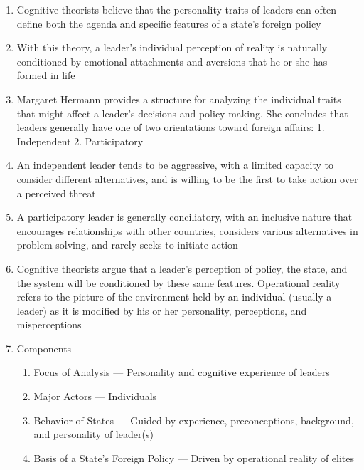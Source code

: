 \documentclass[12pt]{article}
\begin{document}
\begin{enumerate}
      \item Cognitive theorists believe that the personality traits of leaders can often define both the agenda and specific features of a state’s foreign policy

      \item With this theory, a leader’s individual perception of reality is naturally conditioned by emotional attachments and aversions that he or she has formed in life

      \item Margaret Hermann provides a structure for analyzing the individual traits that might affect a leader’s decisions and policy making. She concludes that leaders generally have one of two orientations toward foreign affairs: 1. Independent 2. Participatory 

      \item An independent leader tends to be aggressive, with a limited capacity to consider different alternatives, and is willing to be the first to take action over a perceived threat

      \item A participatory leader is generally conciliatory, with an inclusive nature that encourages relationships with other countries, considers various alternatives in problem solving, and rarely seeks to initiate action

      \item Cognitive theorists argue that a leader’s perception of policy, the state, and the system will be conditioned by these same features.  Operational reality refers to the picture of the environment held by an individual (usually a leader) as it is modified by his or her personality, perceptions, and misperceptions

      \item Components

        \begin{enumerate}

          \item Focus of Analysis — Personality and cognitive experience of leaders

          \item Major Actors — Individuals

          \item Behavior of States — Guided by experience, preconceptions, background, and personality of leader(s)

          \item Basis of a State's Foreign Policy — Driven by operational reality of elites


\end{enumerate}
\end{enumerate}
\end{document}
